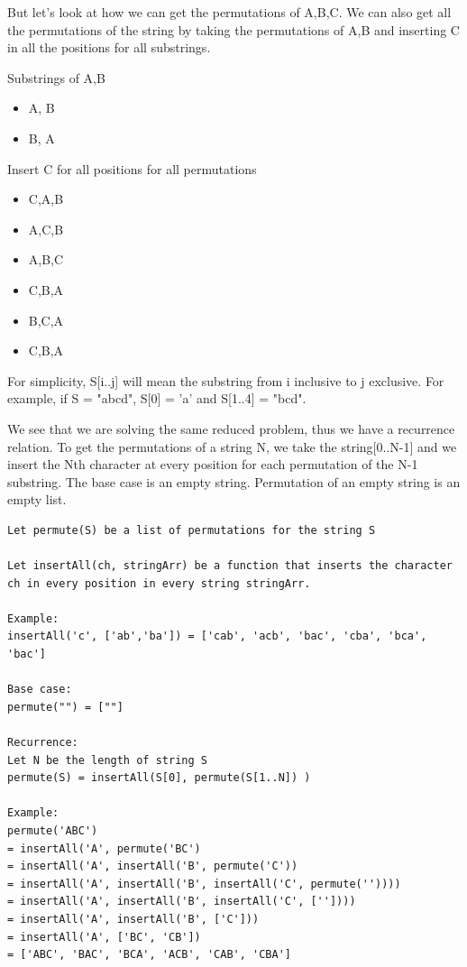 \documentclass[11pt,oneside]{book}
\begin{document}
But let's look at how we can get the permutations of A,B,C. We can also get all the permutations of the string by taking the permutations of A,B and inserting C in all the positions for all substrings.

Substrings of A,B

\begin{itemize}
\item A, B
\item B, A
\end{itemize}

Insert C for all positions for all permutations

\begin{itemize}
\item C,A,B
\item A,C,B
\item A,B,C
\item C,B,A
\item B,C,A
\item C,B,A
\end{itemize}

For simplicity, S[i..j] will mean the substring from i inclusive to j exclusive. For example, if S = "abcd", S[0] = 'a' and S[1..4] = "bcd".

We see that we are solving the same reduced problem, thus we have a recurrence relation. To get the permutations of a string N, we take the string[0..N-1] and we insert the Nth character at every position for each permutation of the N-1 substring. The base case is an empty string. Permutation of an empty string is an empty list.

\begin{lstlisting}
Let permute(S) be a list of permutations for the string S

Let insertAll(ch, stringArr) be a function that inserts the character ch in every position in every string stringArr.

Example: 
insertAll('c', ['ab','ba']) = ['cab', 'acb', 'bac', 'cba', 'bca', 'bac'] 

Base case:
permute("") = [""]

Recurrence:
Let N be the length of string S
permute(S) = insertAll(S[0], permute(S[1..N]) )

Example:
permute('ABC')
= insertAll('A', permute('BC')
= insertAll('A', insertAll('B', permute('C'))
= insertAll('A', insertAll('B', insertAll('C', permute(''))))
= insertAll('A', insertAll('B', insertAll('C', [''])))
= insertAll('A', insertAll('B', ['C']))
= insertAll('A', ['BC', 'CB'])
= ['ABC', 'BAC', 'BCA', 'ACB', 'CAB', 'CBA']
\end{lstlisting}
\end{document}

